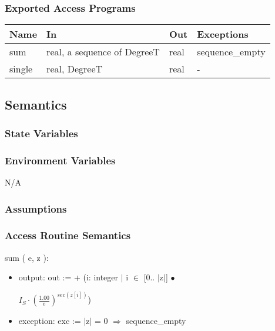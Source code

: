 \documentclass[12pt, titlepage]{article}
\begin{document}
\subsubsection{Exported Access Programs}

\begin{center}
\begin{tabular}{p{2cm} p{5cm} p{3cm} p{2cm}}
\hline
\textbf{Name} & \textbf{In} & \textbf{Out} & \textbf{Exceptions} \\
\hline 
sum & real, a sequence of DegreeT & real & sequence\_empty \\
single & real, DegreeT & real & - \\

\hline
\end{tabular}
\end{center}


\subsection{Semantics}

\subsubsection{State Variables}


\subsubsection{Environment Variables}

N/A

\subsubsection{Assumptions}

\subsubsection{ Access Routine Semantics}

\noindent sum ( e, z ):
\begin{itemize}
\item output: out := + (i: integer $|$ i $\in$ [0.. $|$z$|$] $\bullet$ 
\begin{center}\large
$I_{S} \cdot (\frac{1.00}{e})^{sec(z [ i ])} $)
\end{center}
\item exception: exc := $|$z$|$ = 0 $\Rightarrow$ sequence\_empty
\end{itemize}
\end{document}
